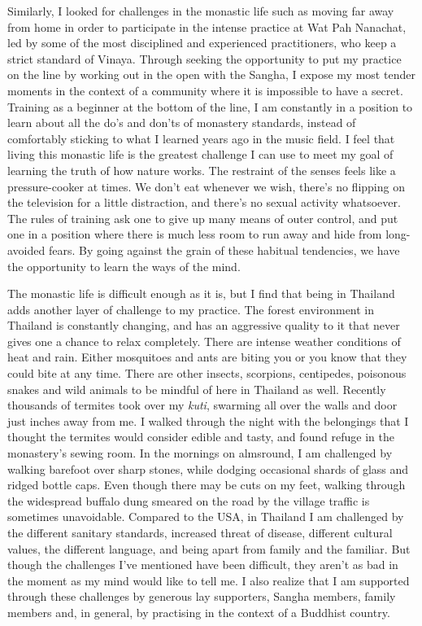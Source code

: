 Similarly, I looked for challenges in the monastic life such as moving
far away from home in order to participate in the intense practice at
Wat Pah Nanachat, led by some of the most disciplined and experienced
practitioners, who keep a strict standard of Vinaya. Through seeking the
opportunity to put my practice on the line by working out in the open
with the Sangha, I expose my most tender moments in the context of a
community where it is impossible to have a secret. Training as a
beginner at the bottom of the line, I am constantly in a position to
learn about all the do's and don'ts of monastery standards, instead of
comfortably sticking to what I learned years ago in the music field. I
feel that living this monastic life is the greatest challenge I can use
to meet my goal of learning the truth of how nature works. The restraint
of the senses feels like a pressure-cooker at times. We don't eat
whenever we wish, there's no flipping on the television for a little
distraction, and there's no sexual activity whatsoever. The rules of
training ask one to give up many means of outer control, and put one in
a position where there is much less room to run away and hide from
long-avoided fears. By going against the grain of these habitual
tendencies, we have the opportunity to learn the ways of the mind.

The monastic life is difficult enough as it is, but I find that being in
Thailand adds another layer of challenge to my practice. The forest
environment in Thailand is constantly changing, and has an aggressive
quality to it that never gives one a chance to relax completely. There
are intense weather conditions of heat and rain. Either mosquitoes and
ants are biting you or you know that they could bite at any time. There
are other insects, scorpions, centipedes, poisonous snakes and wild
animals to be mindful of here in Thailand as well. Recently thousands of
termites took over my \emph{kuti}, swarming all over the walls and door
just inches away from me. I walked through the night with the belongings
that I thought the termites would consider edible and tasty, and found
refuge in the monastery's sewing room. In the mornings on almsround, I
am challenged by walking barefoot over sharp stones, while dodging
occasional shards of glass and ridged bottle caps. Even though there may
be cuts on my feet, walking through the widespread buffalo dung smeared
on the road by the village traffic is sometimes unavoidable. Compared to
the USA, in Thailand I am challenged by the different sanitary
standards, increased threat of disease, different cultural values, the
different language, and being apart from family and the familiar. But
though the challenges I've mentioned have been difficult, they aren't as
bad in the moment as my mind would like to tell me. I also realize that
I am supported through these challenges by generous lay supporters,
Sangha members, family members and, in general, by practising in the
context of a Buddhist country.

